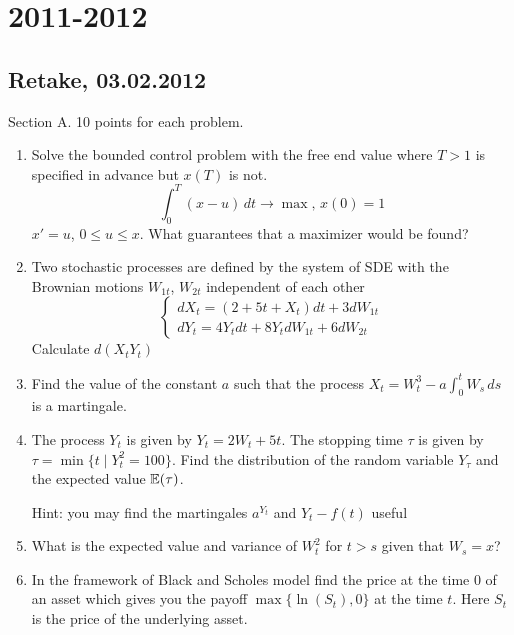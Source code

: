 \documentclass[12pt, a4paper]{article}
\begin{document}
\section{2011-2012}

\subsection{Retake, 03.02.2012}

Section A.  10 points for each problem.

\begin{enumerate}
\item Solve the bounded control problem with the free end value where $T>1$ is specified in advance but $x(T)$ is not.
\begin{equation}
\int_0^T(x-u)\,dt\to \max,\, x(0)=1 \nonumber
\end{equation}
$x'=u$, $0\leq u\leq x$. What guarantees that a maximizer would be found?

\item Two stochastic processes are defined by the system of SDE with the Brownian motions $W_{1t}$, $W_{2t}$ independent of each other
\begin{equation}
\begin{cases}
dX_t=(2+5t+X_t)dt+3dW_{1t} \\
dY_t=4Y_t dt+8Y_t dW_{1t}+6dW_{2t} \nonumber
\end{cases}
\end{equation}
Calculate $d(X_t Y_t)$

\item Find the value of the constant $a$ such that the process $X_t=W_t^3-a\int_0^t W_s\,ds$ is a martingale.

\item The process $Y_t$ is given by $Y_t=2W_t+5t$. The stopping time $\tau$ is given by $\tau=\min\{t \mid Y_t^2=100\}$. Find the distribution of the random variable $Y_\tau$ and the expected value $\operatorname{\mathbb{E}}(\tau)$.


Hint: you may find the martingales $a^{Y_t}$ and $Y_t-f(t)$ useful

\item What is the expected value and variance of $W_t^2$ for $t>s$ given that $W_s=x$?

\item In the framework of Black and Scholes model find the price at the time $0$ of an asset which gives you the payoff $\max\{\ln(S_t),0\}$ at the time $t$. Here $S_t$ is the price of the underlying asset.
\end{enumerate}
\end{document}
